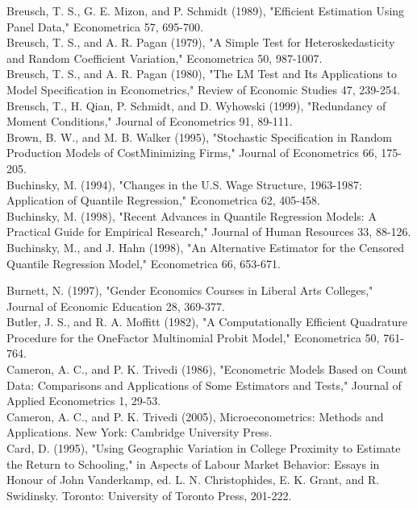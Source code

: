 \documentclass[10pt]{article}
\begin{document}
Breusch, T. S., G. E. Mizon, and P. Schmidt (1989), "Efficient Estimation Using Panel Data," Econometrica 57, 695-700.\\
Breusch, T. S., and A. R. Pagan (1979), "A Simple Test for Heteroskedasticity and Random Coefficient Variation," Econometrica 50, 987-1007.\\
Breusch, T. S., and A. R. Pagan (1980), "The LM Test and Its Applications to Model Specification in Econometrics," Review of Economic Studies 47, 239-254.\\
Breusch, T., H. Qian, P. Schmidt, and D. Wyhowski (1999), "Redundancy of Moment Conditions," Journal of Econometrics 91, 89-111.\\
Brown, B. W., and M. B. Walker (1995), "Stochastic Specification in Random Production Models of CostMinimizing Firms," Journal of Econometrics 66, 175-205.\\
Buchinsky, M. (1994), "Changes in the U.S. Wage Structure, 1963-1987: Application of Quantile Regression," Econometrica 62, 405-458.\\
Buchinsky, M. (1998), "Recent Advances in Quantile Regression Models: A Practical Guide for Empirical Research," Journal of Human Resources 33, 88-126.\\
Buchinsky, M., and J. Hahn (1998), "An Alternative Estimator for the Censored Quantile Regression Model," Econometrica 66, 653-671.

Burnett, N. (1997), "Gender Economics Courses in Liberal Arts Colleges," Journal of Economic Education 28, 369-377.\\
Butler, J. S., and R. A. Moffitt (1982), "A Computationally Efficient Quadrature Procedure for the OneFactor Multinomial Probit Model," Econometrica 50, 761-764.\\
Cameron, A. C., and P. K. Trivedi (1986), "Econometric Models Based on Count Data: Comparisons and Applications of Some Estimators and Tests," Journal of Applied Econometrics 1, 29-53.\\
Cameron, A. C., and P. K. Trivedi (2005), Microeconometrics: Methods and Applications. New York: Cambridge University Press.\\
Card, D. (1995), "Using Geographic Variation in College Proximity to Estimate the Return to Schooling," in Aspects of Labour Market Behavior: Essays in Honour of John Vanderkamp, ed. L. N. Christophides, E. K. Grant, and R. Swidinsky. Toronto: University of Toronto Press, 201-222.
\end{document}
